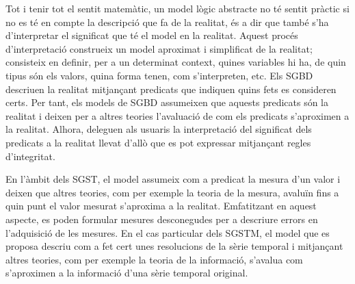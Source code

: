 Tot i tenir tot el sentit matemàtic, un model lògic abstracte no té
sentit pràctic si no es té en compte la descripció que fa de la
realitat, és a dir que també s'ha d'interpretar el significat que té
el model en la realitat.  Aquest procés d'interpretació construeix un
model aproximat i simplificat de la realitat; consisteix en definir,
per a un determinat context, quines variables hi ha, de quin tipus són
els valors, quina forma tenen, com s'interpreten, etc.  Els \gls{SGBD}
descriuen la realitat mitjançant predicats que indiquen quins fets es
consideren certs. Per tant, els models de \gls{SGBD} assumeixen que
aquests predicats són la realitat i deixen per a altres teories
l'avaluació de com els predicats s'aproximen a la realitat. Alhora,
deleguen als usuaris la interpretació del significat dels predicats a
la realitat llevat d'allò que es pot expressar mitjançant regles
d'integritat.


En l'àmbit dels \gls{SGST}, el model assumeix com a predicat la mesura
d'un valor i deixen que altres teories, com per exemple la teoria de
la mesura, avaluïn fins a quin punt el valor mesurat s'aproxima a la
realitat. Emfatitzant en aquest aspecte, es poden formular mesures
desconegudes per a descriure errors en l'adquisició de les mesures. En
el cas particular dels \gls{SGSTM}, el model que es proposa descriu
com a fet cert unes resolucions de la sèrie temporal i mitjançant
altres teories, com per exemple la teoria de la informació, s'avalua
com s'aproximen a la informació d'una sèrie temporal original.






